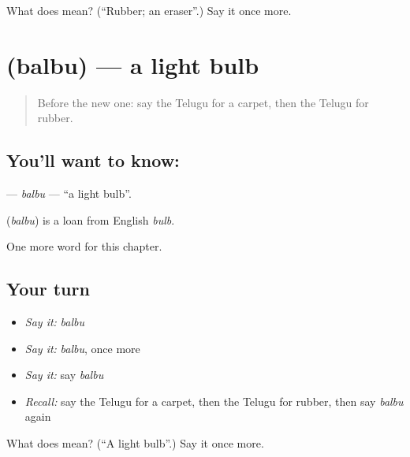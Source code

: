 \begin{tcolorbox}[breakable,colback=teal!4,colframe=teal!35!black,title={Before you move on}]
What does  mean? (\textquotedblleft{}Rubber; an eraser\textquotedblright{}.) Say it once more.
\end{tcolorbox}
\section[\texorpdfstring{\te{బల్బు} (balbu)}{బల్బు (balbu)}]{ (balbu) — a light bulb}

\label{lesson:TE-C191-balbu}



\begin{quote}
Before the new one: say the Telugu for a carpet, then the Telugu for rubber.
\end{quote}

\subsection*{You'll want to know: }
\textbf{} — \emph{balbu} — \textquotedblleft{}a light bulb\textquotedblright{}.

\begin{cousinweb}
\textbf{} (\emph{balbu}) is a loan from English \emph{bulb}.
\end{cousinweb}

\begin{grammarlens}[title={What you've built}]
One more word for this chapter.
\end{grammarlens}

\subsection*{Your turn}
\begin{itemize}
\raggedright
  \item \emph{Say it:} \emph{balbu}
  \item \emph{Say it:} \emph{balbu}, once more
  \item \emph{Say it:} say \emph{balbu}
  \item \emph{Recall:} say the Telugu for a carpet, then the Telugu for rubber, then say \emph{balbu} again
\end{itemize}

\begin{tcolorbox}[breakable,colback=teal!4,colframe=teal!35!black,title={Before you move on}]
What does  mean? (\textquotedblleft{}A light bulb\textquotedblright{}.) Say it once more.
\end{tcolorbox}
